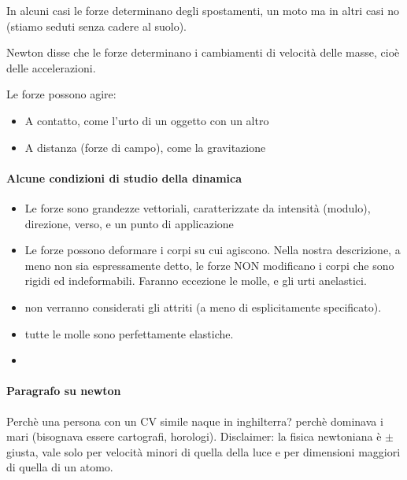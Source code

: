 \documentclass[12pt, a4paper, openany]{book}
\begin{document}
In alcuni casi le forze determinano degli spostamenti, un moto ma in altri casi no (stiamo seduti senza cadere al suolo).

Newton disse che le forze determinano i cambiamenti di velocità delle masse, cioè delle
accelerazioni.


Le forze possono agire:
\begin{itemize}
    \item A contatto, come l'urto di un oggetto con un altro
    \item A distanza (forze di campo), come la gravitazione
\end{itemize}

\paragraph*{Alcune condizioni di studio della dinamica}
\begin{itemize}
    \item Le forze sono grandezze vettoriali, caratterizzate da intensità (modulo), direzione, verso,
          e un punto di applicazione
    \item Le forze possono deformare i corpi su cui agiscono. Nella nostra descrizione, a meno
          non sia espressamente detto, le forze NON modificano i corpi che sono rigidi ed
          indeformabili. Faranno eccezione le molle, e gli urti anelastici.
    \item non verranno considerati gli attriti (a meno di esplicitamente specificato).
    \item tutte le molle sono perfettamente elastiche.
    \item
\end{itemize}

\paragraph*{Paragrafo su newton} Perchè una persona con un CV simile naque in inghilterra? perchè dominava i mari (bisognava essere cartografi, horologi).
Disclaimer: la fisica newtoniana è $\pm$ giusta, vale solo per velocità minori di quella della luce e per dimensioni maggiori di quella di un atomo.
\end{document}
